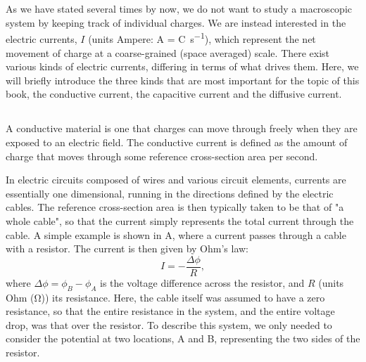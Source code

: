 \section{}
\label{sec:Basics:Current} 
As we have stated several times by now, we do not want to study a macroscopic system by keeping track of individual charges. We are instead interested in the electric currents, $I$ (units Ampere: \si{\ampere} = \si{\coulomb\per\second}), which represent the net movement of charge at a coarse-grained (space averaged) scale. 
 There exist various kinds of electric currents, differing in terms of what drives them. Here, we will briefly introduce the three kinds that are most important for the topic of this book, the conductive current, the capacitive current and the diffusive current.


\subsection{}
\label{sec:Basics:ConductiveCurrent} 
A conductive material   is one that  charges can move through freely when they are exposed to an electric field. The conductive current is defined as the amount of charge that moves through some reference cross-section area per second. 

In electric circuits composed of  wires and various circuit elements, currents are essentially one dimensional, running in the directions defined by the electric cables. The reference cross-section area is then typically taken to be that of "a whole cable", so that the current simply represents the total current through the cable. A simple example is shown in A, where a current passes through a cable with a resistor. The current is then given by Ohm's law:
\begin{equation}
I = - \frac{\Delta \phi}{R}, 
\label{eq:Basics:Ohm_R}
\end{equation}
where $\Delta \phi = \phi_B-\phi_A$ is the voltage difference across the resistor, and $R$ (units Ohm (\si{\ohm})) its resistance. Here, the cable itself was assumed to have a zero resistance, so that the entire resistance in the system, and the entire voltage drop, was that over the resistor. To describe this system, we only needed to consider the potential at two locations, A and B, representing the two sides of the resistor. 

